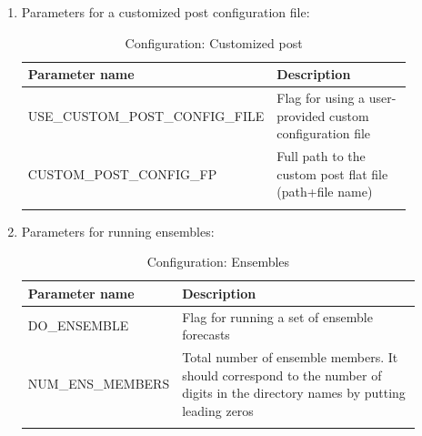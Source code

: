 \documentclass[11pt,fleqn]{report}              %
\begin{document}
\begin{enumerate}
\item Parameters for a customized post configuration file:
{
\scriptsize
\begin{longtable}{p{0.34\linewidth} | p{0.54\linewidth} }
\hline
\hline
Parameter name & Description \\
\hline
USE\_CUSTOM\_POST\_CONFIG\_FILE & Flag for using a user-provided custom configuration file \\
CUSTOM\_POST\_CONFIG\_FP & Full path to the custom post flat file (path+file name) \\
\hline
\caption{Configuration: Customized post}
\label{table:config_custompost}
\end{longtable}
}

\item Parameters for running ensembles:
{
\scriptsize
\begin{longtable}{p{0.2\linewidth} | p{0.7\linewidth} }
\hline
\hline
Parameter name & Description \\
\hline
DO\_ENSEMBLE & Flag for running a set of ensemble forecasts \\
NUM\_ENS\_MEMBERS & Total number of ensemble members. It should correspond to the number of digits in the directory names by putting leading zeros \\
\hline
\caption{Configuration: Ensembles}
\label{table:config_ensembles}
\end{longtable}
}


\end{enumerate}
\end{document}
